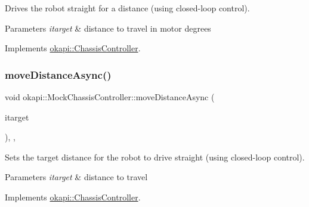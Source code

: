 Drives the robot straight for a distance (using closed-\/loop control). 


\begin{DoxyParams}{Parameters}
{\em itarget} & distance to travel in motor degrees \\
\hline
\end{DoxyParams}


Implements \mbox{\hyperlink{classokapi_1_1ChassisController_a58619e777fd1b3f8e1aae871d46a8ccf}{okapi\+::\+Chassis\+Controller}}.

\mbox{\label{classokapi_1_1MockChassisController_a7d0f2e65c7c1c58394b825a6fad39a13}} 
\subsubsection{\texorpdfstring{moveDistanceAsync()}{moveDistanceAsync()}\hspace{0.1cm}{\footnotesize\ttfamily [1/2]}}
{\footnotesize\ttfamily void okapi\+::\+Mock\+Chassis\+Controller\+::move\+Distance\+Async (\begin{DoxyParamCaption}\item[{Q\+Length}]{itarget }\end{DoxyParamCaption})\hspace{0.3cm}{\ttfamily [inline]}, {\ttfamily [override]}, {\ttfamily [virtual]}}



Sets the target distance for the robot to drive straight (using closed-\/loop control). 


\begin{DoxyParams}{Parameters}
{\em itarget} & distance to travel \\
\hline
\end{DoxyParams}


Implements \mbox{\hyperlink{classokapi_1_1ChassisController_a67a17268b871a4f1ae74d67891cbf5dd}{okapi\+::\+Chassis\+Controller}}.

\mbox{\label{classokapi_1_1MockChassisController_acd06c9ba237eaef83546066643665642}} 
